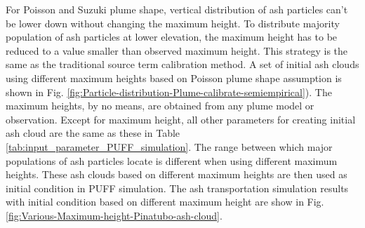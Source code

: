 \begin{figure}[!htb]
    \label{fig:Particle-distribution-Plume-SPH-vs-semiempirical}
\end{figure}

For Poisson and Suzuki plume shape, vertical distribution of ash particles can't be lower down without changing the maximum height. To distribute majority population of ash particles at lower elevation, the maximum height has to be reduced to a value smaller than observed maximum height. This strategy is the same as the traditional source term calibration method. A set of initial ash clouds using different maximum heights based on Poisson plume shape assumption is shown in Fig. \ref{fig:Particle-distribution-Plume-calibrate-semiempirical}). The maximum heights, by no means, are obtained from any plume model or observation. Except for maximum height, all other parameters for creating initial ash cloud are the same as these in Table \ref{tab:input_parameter_PUFF_simulation}. The range between which major populations of ash particles locate is different when using different maximum heights. These ash clouds based on different maximum heights are then used as initial condition in PUFF simulation. The ash transportation simulation results with initial condition based on different maximum height are show in Fig. \ref{fig:Various-Maximum-height-Pinatubo-ash-cloud}.


